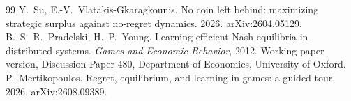 \documentclass[11pt,a4paper]{article}
\theoremstyle{definition}
\theoremstyle{plain}
\begin{document}
\begin{thebibliography}{99}
 Y.~Su, E.-V.~Vlatakis-Gkaragkounis. No coin left behind: maximizing strategic surplus against no-regret dynamics. 2026. arXiv:2604.05129.
 B.~S.~R.~Pradelski, H.~P.~Young. Learning efficient Nash equilibria in distributed systems. \emph{Games and Economic Behavior}, 2012. Working paper version, Discussion Paper 480, Department of Economics, University of Oxford.
 P.~Mertikopoulos. Regret, equilibrium, and learning in games: a guided tour. 2026. arXiv:2608.09389.
\end{thebibliography}
\end{document}
